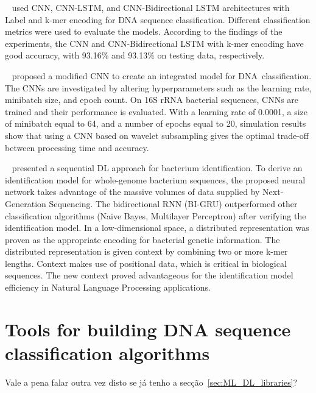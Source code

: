 \citeauthor{Gunasekaran2021AnalysisModels}~\cite{Gunasekaran2021AnalysisModels} used \gls{CNN}, \gls{CNN}-\gls{LSTM}, and \gls{CNN}-Bidirectional \gls{LSTM} architectures with Label and k-mer encoding for \gls{DNA} sequence classification. Different classification metrics were used to evaluate the models. According to the findings of the experiments, the \gls{CNN} and \gls{CNN}-Bidirectional \gls{LSTM} with k-mer encoding have good accuracy, with 93.16\% and 93.13\% on testing data, respectively.

\citeauthor{Soliman2021AnClassification}~\cite{Soliman2021AnClassification} proposed a modified \gls{CNN} to create an integrated model for \gls{DNA} classification. The \gls{CNN}s are investigated by altering hyperparameters such as the learning rate, minibatch size, and epoch count. On 16S rRNA bacterial sequences, \gls{CNN}s are trained and their performance is evaluated. With a learning rate of 0.0001, a size of minibatch equal to 64, and a number of epochs equal to 20, simulation results show that using a \gls{CNN} based on wavelet subsampling gives the optimal trade-off between processing time and accuracy.

\citeauthor{Lugo2021AIdentification}~\cite{Lugo2021AIdentification} presented a sequential \gls{DL} approach for bacterium identification. To derive an identification model for whole-genome bacterium sequences, the proposed neural network takes advantage of the massive volumes of data supplied by Next-Generation Sequencing. The bidirectional \gls{RNN} (BI-\gls{GRU}) outperformed other classification algorithms (Naive Bayes, Multilayer Perceptron) after verifying the identification model. In a low-dimensional space, a distributed representation was proven as the appropriate encoding for bacterial genetic information. The distributed representation is given context by combining two or more k-mer lengths. Context makes use of positional data, which is critical in biological sequences. The new context proved advantageous for the identification model efficiency in Natural Language Processing applications. 


\section{Tools for building DNA sequence classification algorithms}

Vale a pena falar outra vez disto se já tenho a secção~\ref{sec:ML_DL_libraries}?

